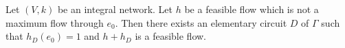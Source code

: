 Let $(V, k)$ be an integral network. Let $h$ be a feasible flow which is not a maximum flow through $e_0$. Then there exists an elementary circuit $D$ of $\Gamma$ such that $h_D(e_0) = 1$ and $h + h_D$ is a feasible flow.
